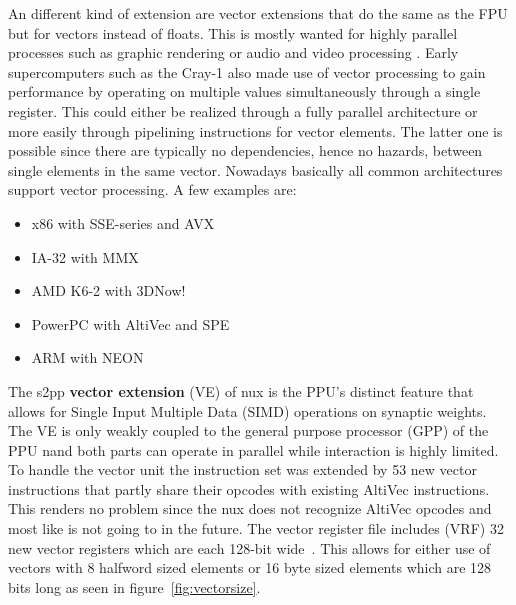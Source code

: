 An different kind of extension are vector extensions that do the same as the FPU but for vectors instead of floats.
This is mostly wanted for highly parallel processes such as graphic rendering or audio and video processing .
Early supercomputers such as the Cray-1  also made use of vector processing to gain performance by operating on multiple values  simultaneously through a single register.
This could either be realized through a fully parallel architecture or more easily through pipelining instructions for vector elements.
The latter one is possible since there are typically no dependencies, hence no hazards, between single elements in the same vector.
Nowadays basically all common architectures support vector processing.
A few examples are:

\noindent\begin{minipage}{\textwidth}
    \vspace{1em}
    \begin{minipage}{0.4\textwidth}
\begin{itemize}
    \item x86 with SSE-series and AVX
    \item IA-32 with MMX
    \item AMD K6-2 with 3DNow!
\end{itemize}
\end{minipage}
    \begin{minipage}{0.6\textwidth}
\begin{itemize}
    \item PowerPC with AltiVec and SPE
    \item ARM with NEON
\end{itemize}
\end{minipage}
    \vspace{1em}
\end{minipage}

The s2pp \textbf{vector extension} (VE) of nux is the PPU's distinct feature that allows for Single Input Multiple Data (SIMD) operations on synaptic weights.
The VE is only weakly coupled to the general purpose processor (GPP) of the PPU nand both parts can operate in parallel while interaction is highly limited.
To handle the vector unit the instruction set was extended by 53 new vector instructions that partly share their opcodes with existing AltiVec instructions.
This renders no problem since the nux does not recognize AltiVec opcodes and most like is not going to in the future.
The vector register file includes (VRF) 32 new vector registers which are each 128-bit wide~\citep{AV:registers}.
This allows for either use of vectors with 8 halfword sized elements or 16 byte sized elements which are 128 bits long as seen in figure~\ref{fig:vectorsize}.

